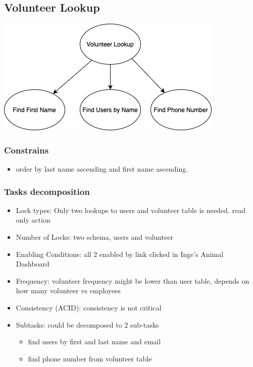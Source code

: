 \documentclass[a4paper]{article}
\begin{document}
\hypertarget{volunteer_lookup}{\subsection{Volunteer Lookup}}
\includegraphics[scale = 0.6]{volunteer_lookup.png}

\subsubsection*{Constrains}
\begin{itemize}

    \item order by last name ascending and first name ascending.
\end{itemize}

\subsubsection*{Tasks decomposition}
\begin{itemize}
	\item  Lock types: Only two lookups to users and volunteer table is needed. read only action
    \item Number of Locks: two schema, users  and volunteer
    \item Enabling Conditions: all 2 enabled by link clicked in Inge's Animal Dashboard
    \item Frequency: volunteer frequency might be lower than user table, depends on how
    many volunteer vs employees
    \item Consistency (ACID): consistency is not critical
    \item Subtasks: could be decomposed to 2 sub-tasks
    \begin{itemize}

        \item find users by first and last name and email
        \item find phone number from volunteer table

    \end{itemize}

\end{itemize}
\end{document}
